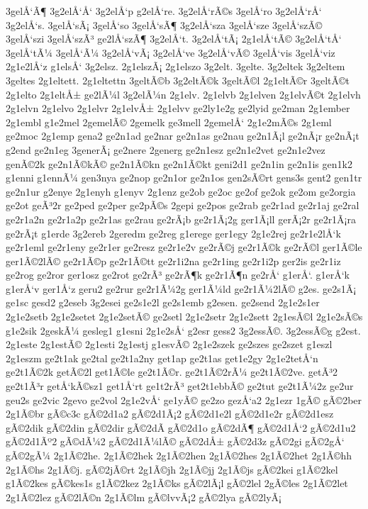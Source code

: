 {3gelÅ‘Ã¶
3g2elÅ‘Å‘
3g2elÅ‘p
g2elÅ‘re.
3g2elÅ‘rÃ©s
3gelÅ‘ro
3g2elÅ‘rÅ‘
3g2elÅ‘s.
3gelÅ‘sÃ¡
3gelÅ‘so
3gelÅ‘sÃ¶
3g2elÅ‘sza
3gelÅ‘sze
3gelÅ‘szÃ©
3gelÅ‘szi
3gelÅ‘szÃ³
ge2lÅ‘szÃ¶
3g2elÅ‘t.
3g2elÅ‘tÃ¡
2g1elÅ‘tÃ©
3g2elÅ‘tÅ‘
3gelÅ‘tÃ¼
3gelÅ‘Ã¼
3g2elÅ‘vÃ¡
3g2elÅ‘ve
3g2elÅ‘vÃ©
3gelÅ‘vis
3gelÅ‘viz
2g1e2lÅ‘z
g1elsÅ‘
3g2elsz.
2g1elszÃ¡
2g1elszo
3g2elt.
3gelte.
3g2eltek
3g2eltem
3geltes
2g1eltett.
2g1eltettn
3geltÃ©b
3g2eltÃ©k
3geltÃ©l
2g1eltÃ©r
3geltÃ©t
2g1elto
2g1eltÅ±
ge2lÃ¼l
3g2elÃ¼n
2g1elv.
2g1elvb
2g1elven
2g1elvÃ©t
2g1elvh
2g1elvn
2g1elvo
2g1elvr
2g1elvÅ±
2g1elvv
ge2ly1e2g
ge2lyid
ge2man
2g1ember
2g1embl
g1e2mel
2gemelÃ©
2gemelk
ge3mell
2gemelÅ‘
2g1e2mÃ©s
2g1eml
ge2moc
2g1emp
gena2
ge2n1ad
ge2nar
ge2n1as
ge2nau
ge2n1Ã¡l
ge2nÃ¡r
ge2nÃ¡t
g2end
ge2n1eg
3generÃ¡
ge2nere
2generg
ge2n1esz
ge2n1e2vet
ge2n1e2vez
genÃ©2k
ge2n1Ã©kÃ©
ge2n1Ã©kn
ge2n1Ã©kt
geni2d1
ge2n1in
ge2n1is
gen1k2
g1enni
g1ennÃ¼
gen3nya
ge2nop
ge2n1or
ge2n1os
gen2sÃ©rt
gens3s
gent2
gen1tr
ge2n1ur
g2enye
2g1enyh
g1enyv
2g1enz
ge2ob
ge2oc
ge2of
ge2ok
ge2om
ge2orgia
ge2ot
geÃ³2r
ge2ped
ge2per
ge2pÃ©s
2gepi
ge2pos
ge2rab
ge2r1ad
ge2r1aj
ge2ral
ge2r1a2n
ge2r1a2p
ge2r1as
ge2rau
ge2rÃ¡b
ge2r1Ã¡2g
ger1Ã¡ll
gerÃ¡2r
ge2r1Ã¡ra
ge2rÃ¡t
g1erde
3g2ereb
2geredm
ge2reg
g1erege
ger1egy
2g1e2rej
ge2r1e2lÅ‘k
ge2r1eml
ge2r1eny
ge2r1er
ge2resz
ge2r1e2v
ge2rÃ©j
ge2r1Ã©k
ge2rÃ©l
ger1Ã©le
ger1Ã©2lÃ©
ge2r1Ã©p
ge2r1Ã©tt
ge2r1i2na
ge2r1ing
ge2r1i2p
ger2is
ge2r1iz
ge2rog
ge2ror
ger1osz
ge2rot
ge2rÃ³
ge2rÃ¶k
ge2r1Ã¶n
ge2rÅ‘
g1erÅ‘.
g1erÅ‘k
g1erÅ‘v
ger1Å‘z
geru2
ge2rur
ge2r1Ã¼2g
ger1Ã¼ld
ge2r1Ã¼2lÃ©
g2es.
ge2s1Ã¡
ge1sc
gesd2
g2eseb
3g2esei
ge2s1e2l
ge2s1emb
g2esen.
ge2send
2g1e2s1er
2g1e2setb
2g1e2setet
2g1e2setÃ©
ge2setl
2g1e2setr
2g1e2sett
2g1esÃ©l
2g1e2sÃ©s
g1e2sik
2geskÃ¼
gesleg1
g1esni
2g1e2sÅ‘
g2esr
gess2
3g2essÃ©.
3g2essÃ©g
g2est.
2g1este
2g1estÃ©
2g1esti
2g1estj
g1esvÃ©
2g1e2szek
ge2szes
ge2szet
g1eszl
2g1eszm
ge2t1ak
ge2tal
ge2t1a2ny
get1ap
ge2t1as
get1e2gy
2g1e2tetÅ‘n
ge2t1Ã©2k
getÃ©2l
get1Ã©le
ge2t1Ã©r.
ge2t1Ã©2rÃ¼
ge2t1Ã©2ve.
getÃ³2
ge2t1Ã³r
getÅ‘kÃ©sz1
get1Å‘rt
ge1t2rÃ³
get2t1ebbÃ©
ge2tut
ge2t1Ã¼2z
ge2ur
geu2s
ge2vic
2gevo
ge2vol
2g1e2vÅ‘
ge1yÃ©
ge2zo
gezÅ‘a2
2g1ezr
1gÃ©
gÃ©2ber
2g1Ã©br
gÃ©c3c
gÃ©2d1a2
gÃ©2d1Ã¡2
gÃ©2d1e2l
gÃ©2d1e2r
gÃ©2d1esz
gÃ©2dik
gÃ©2din
gÃ©2dir
gÃ©2dÃ­
gÃ©2d1o
gÃ©2dÃ¶
gÃ©2d1Å‘2
gÃ©2d1u2
gÃ©2d1Ãº2
gÃ©dÃ¼2
gÃ©2d1Ã¼lÃ©
gÃ©2dÅ±
gÃ©2d3z
gÃ©2gi
gÃ©2gÅ‘
gÃ©2gÃ¼
2g1Ã©2he.
2g1Ã©2hek
2g1Ã©2hen
2g1Ã©2hes
2g1Ã©2het
2g1Ã©hh
2g1Ã©hs
2g1Ã©j.
gÃ©2jÃ©rt
2g1Ã©jh
2g1Ã©jj
2g1Ã©js
gÃ©2kei
g1Ã©2kel
g1Ã©2kes
gÃ©kes1s
g1Ã©2kez
2g1Ã©ks
gÃ©2lÃ¡l
gÃ©2lel
2gÃ©les
2g1Ã©2let
2g1Ã©2lez
gÃ©2lÃ©n
2g1Ã©lm
gÃ©lvvÃ¡2
gÃ©2lya
gÃ©2lyÃ¡
}
